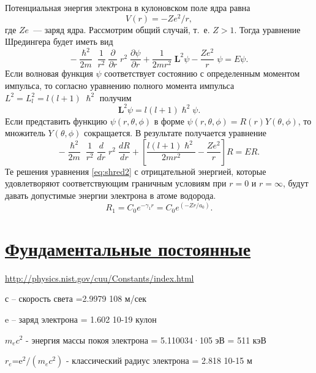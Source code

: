 \documentclass[a4paper,14pt, openany, twoside, draft]{extbook} %
\begin{document}
Потенциальная энергия электрона в кулоновском поле ядра равна
\begin{equation}
  \label{eq:potenergy}
V(r)=-Ze^2/r,
\end{equation}
где $Ze$~--- заряд ядра.  Рассмотрим общий случай, т.~е. $Z>1$.  Тогда уравнение Шредингера будет иметь вид
\begin{equation}
  \label{eq:shred1}
-\frac{\hslash^2}{2m}\;\frac{1}{r^2}\;\frac{\partial}{\partial r}\;r^2\;\frac{\partial \psi}{\partial r}+\frac{1}{2mr^2}\;{\mathbf{L}}^2\psi-\frac{Ze^2}{r}\;\psi=E\psi.
\end{equation}
Если волновая функция $\psi$ соответствует состоянию с определенным моментом импульса, то согласно уравнению полного момента импульса $L^2=L_{l}^2=l(l+1)\;\hslash^2$ получим
\begin{equation}
  \label{eq:impuls}
{\mathbf{L}}^2\psi=l(l+1)\hslash^2\psi.
\end{equation}
Если представить функцию $\psi(r, \theta, \phi)$ в форме $\psi (r, \theta, \phi)=R(r)Y(\theta, \phi)$, то множитель $Y(\theta, \phi)$ сокращается.  В результате получается уравнение
\begin{equation}
  \label{eq:shred2}
-\frac{\hslash^2}{2m}\;\frac{1}{r^2}\;\frac{d}{dr}\;r^2\;\frac{dR}{dr}+
\left[\frac{l(l+1)\hslash^2}{2mr^2}-\frac{Ze^2}{r}\right]R=ER.
\end{equation}
Те решения уравнения \ref{eq:shred2} с отрицательной энергией, которые удовлетворяют соответствующим граничным условиям при $r=0$ и $r=\infty$, будут давать допустимые энергии электрона в атоме водорода.
\begin{equation}
  \label{eq:wavefunction}
R_1=C_0e^{-\gamma_1r}=C_0e^{(-{Zr}/{a_0})}.
\end{equation}

\newpage
\chapter*[Фундаментальные постоянные]{\protect\href{http://physics.nist.gov/cuu/Constants/index.html}{Фундаментальные постоянные}}
\url{http://physics.nist.gov/cuu/Constants/index.html}

с – скорость света =2.9979 108 м/сек

e – заряд электрона = 1.602 10-19 кулон

 $m_ec^2$ - энергия массы покоя электрона = 5.110034·105 эВ = 511 кэВ

 $r_e{\text{=e}}^2/(m_ec^2)$ - классический радиус электрона = 2.818 10-15 м
\end{document}
